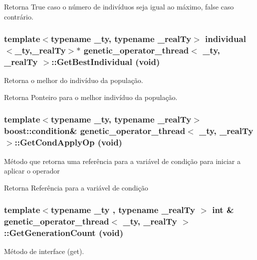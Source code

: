 \begin{DoxyReturn}{Retorna}
True caso o número de indivíduos seja igual ao máximo, false caso contrário. 
\end{DoxyReturn}
\hypertarget{classgenetic__operator__thread_aba37d3926c0ae0f61846a3e98cfeaf39}{
\subsubsection[{GetBestIndividual}]{\setlength{\rightskip}{0pt plus 5cm}template$<$typename \_\-ty, typename \_\-realTy$>$ {\bf individual}$<$\_\-ty,\_\-realTy$>$$\ast$ {\bf genetic\_\-operator\_\-thread}$<$ \_\-ty, \_\-realTy $>$::GetBestIndividual (void)}}
\label{classgenetic__operator__thread_aba37d3926c0ae0f61846a3e98cfeaf39}
Retorna o melhor do indivíduo da população.

\begin{DoxyReturn}{Retorna}
Ponteiro para o melhor indivíduo da população. 
\end{DoxyReturn}
\hypertarget{classgenetic__operator__thread_adbc04b2ec67ef127c316efd2bfb407c4}{
\subsubsection[{GetCondApplyOp}]{\setlength{\rightskip}{0pt plus 5cm}template$<$typename \_\-ty, typename \_\-realTy$>$ boost::condition\& {\bf genetic\_\-operator\_\-thread}$<$ \_\-ty, \_\-realTy $>$::GetCondApplyOp (void)}}
\label{classgenetic__operator__thread_adbc04b2ec67ef127c316efd2bfb407c4}
Método que retorna uma referência para a variável de condição para iniciar a aplicar o operador

\begin{DoxyReturn}{Retorna}
Referência para a variável de condição 
\end{DoxyReturn}
\hypertarget{classgenetic__operator__thread_a22db2979e50888a982e4d78a874b0193}{
\subsubsection[{GetGenerationCount}]{\setlength{\rightskip}{0pt plus 5cm}template$<$typename \_\-ty , typename \_\-realTy $>$ int \& {\bf genetic\_\-operator\_\-thread}$<$ \_\-ty, \_\-realTy $>$::GetGenerationCount (void)}}
\label{classgenetic__operator__thread_a22db2979e50888a982e4d78a874b0193}
Método de interface (get).

